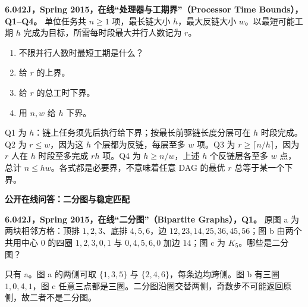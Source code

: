 \begin{exercise}
\textbf{6.042J，Spring 2015，在线“处理器与工期界”（Processor Time Bounds），Q1--Q4。}
单位任务共 $n\ge1$ 项，最长链大小 $h$，最大反链大小 $w$。以最短可能工期 $h$ 完成为目标，所需每时段最大并行人数记为 $r$。
\begin{enumerate}[label=Q\arabic*.]
\item\label{mit:6042-online-processor-time-bounds-q1} 不限并行人数时最短工期是什么？
\item\label{mit:6042-online-processor-time-bounds-q2} 给 $r$ 的上界。
\item\label{mit:6042-online-processor-time-bounds-q3} 给 $r$ 的总工时下界。
\item\label{mit:6042-online-processor-time-bounds-q4} 用 $n,w$ 给 $h$ 下界。
\end{enumerate}
\end{exercise}
\begin{solution}
Q1 为 $h$：链上任务须先后执行给下界；按最长前驱链长度分层可在 $h$ 时段完成。Q2 为 $r\le w$，因为这 $h$ 个层都为反链，每层至多 $w$ 项。Q3 为 $r\ge\lceil n/h\rceil$，因为 $r$ 人在 $h$ 时段至多完成 $rh$ 项。Q4 为 $h\ge n/w$，上述 $h$ 个反链层各至多 $w$ 点，总计 $n\le hw$。各式都是必要界，不意味着任意 DAG 的最优 $r$ 总等于某一个下界。
\end{solution}

\par\addvspace{7pt}\noindent\textbf{公开在线问答：二分图与稳定匹配}\par
\begin{exercise}\label{mit:6042-online-bipartite-graphs-q1}
\textbf{6.042J，Spring 2015，在线“二分图”（Bipartite Graphs），Q1。}
原图 a 为两块相邻方格：顶排 $1,2,3$、底排 $4,5,6$，边 $12,23,14,25,36,45,56$；图 b 由两个共用中心 $0$ 的四圈 $1,2,3,0,1$ 与 $0,4,5,6,0$ 加边 $14$；图 c 为 $K_5$。哪些是二分图？
\end{exercise}
\begin{solution}
只有 a。图 a 的两侧可取 $\{1,3,5\}$ 与 $\{2,4,6\}$，每条边均跨侧。图 b 有三圈 $1,0,4,1$，图 c 任意三点都是三圈。二分图沿圈交替两侧，奇数步不可能返回原侧，故二者不是二分图。
\end{solution}


